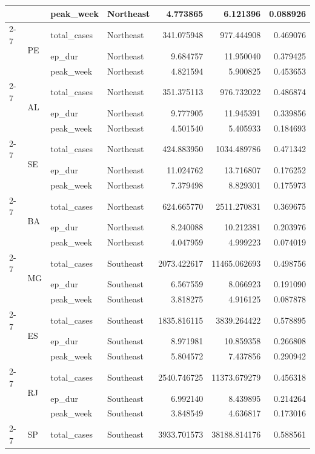 \documentclass{report}
\begin{document}
\begin{center}
\begin{center}
\begin{longtable}{llllrrr}
 &  & peak\_week & Northeast & 4.773865 & 6.121396 & 0.088926 \\
\cline{2-7}
 & \multirow[t]{3}{*}{PE} & total\_cases & Northeast & 341.075948 & 977.444908 & 0.469076 \\
 &  & ep\_dur & Northeast & 9.684757 & 11.950040 & 0.379425 \\
 &  & peak\_week & Northeast & 4.821594 & 5.900825 & 0.453653 \\
\cline{2-7}
 & \multirow[t]{3}{*}{AL} & total\_cases & Northeast & 351.375113 & 976.732022 & 0.486874 \\
 &  & ep\_dur & Northeast & 9.777905 & 11.945391 & 0.339856 \\
 &  & peak\_week & Northeast & 4.501540 & 5.405933 & 0.184693 \\
\cline{2-7}
 & \multirow[t]{3}{*}{SE} & total\_cases & Northeast & 424.883950 & 1034.489786 & 0.471342 \\
 &  & ep\_dur & Northeast & 11.024762 & 13.716807 & 0.176252 \\
 &  & peak\_week & Northeast & 7.379498 & 8.829301 & 0.175973 \\
\cline{2-7}
 & \multirow[t]{3}{*}{BA} & total\_cases & Northeast & 624.665770 & 2511.270831 & 0.369675 \\
 &  & ep\_dur & Northeast & 8.240088 & 10.212381 & 0.203976 \\
 &  & peak\_week & Northeast & 4.047959 & 4.999223 & 0.074019 \\
\cline{2-7}
 & \multirow[t]{3}{*}{MG} & total\_cases & Southeast & 2073.422617 & 11465.062693 & 0.498756 \\
 &  & ep\_dur & Southeast & 6.567559 & 8.066923 & 0.191090 \\
 &  & peak\_week & Southeast & 3.818275 & 4.916125 & 0.087878 \\
\cline{2-7}
 & \multirow[t]{3}{*}{ES} & total\_cases & Southeast & 1835.816115 & 3839.264422 & 0.578895 \\
 &  & ep\_dur & Southeast & 8.971981 & 10.859358 & 0.266808 \\
 &  & peak\_week & Southeast & 5.804572 & 7.437856 & 0.290942 \\
\cline{2-7}
 & \multirow[t]{3}{*}{RJ} & total\_cases & Southeast & 2540.746725 & 11373.679279 & 0.456318 \\
 &  & ep\_dur & Southeast & 6.992140 & 8.439895 & 0.214264 \\
 &  & peak\_week & Southeast & 3.848549 & 4.636817 & 0.173016 \\
\cline{2-7}
 & \multirow[t]{3}{*}{SP} & total\_cases & Southeast & 3933.701573 & 38188.814176 & 0.588561 \\

\end{longtable}
\end{center}
\end{center}
\end{document}
